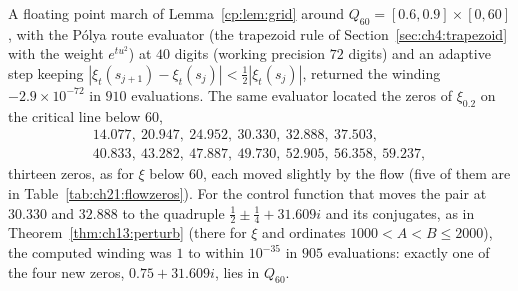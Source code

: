 A floating point march of Lemma~\ref{cp:lem:grid} around $Q_{60}=[0.6,0.9]\times[0,60]$, with the P\'olya route evaluator (the trapezoid rule of Section~\ref{sec:ch4:trapezoid} with the weight $e^{tu^2}$) at $40$ digits (working precision $72$ digits) and an adaptive step keeping $|\xi_t(s_{j+1})-\xi_t(s_j)|<\frac12|\xi_t(s_j)|$, returned the winding $-2.9\times10^{-72}$ in $910$ evaluations. The same evaluator located the zeros of $\xi_{0.2}$ on the critical line below $60$,
\[\begin{gathered}
14.077,\ 20.947,\ 24.952,\ 30.330,\ 32.888,\ 37.503,\\ 40.833,\ 43.282,\ 47.887,\ 49.730,\ 52.905,\ 56.358,\ 59.237,
\end{gathered}\]
thirteen zeros, as for $\xi$ below $60$, each moved slightly by the flow (five of them are in Table~\ref{tab:ch21:flowzeros}). For the control function that moves the pair at $30.330$ and $32.888$ to the quadruple $\frac12\pm\frac14+31.609i$ and its conjugates, as in Theorem~\ref{thm:ch13:perturb} (there for $\xi$ and ordinates $1000<A<B\le2000$), the computed winding was $1$ to within $10^{-35}$ in $905$ evaluations: exactly one of the four new zeros, $0.75+31.609i$, lies in $Q_{60}$.


